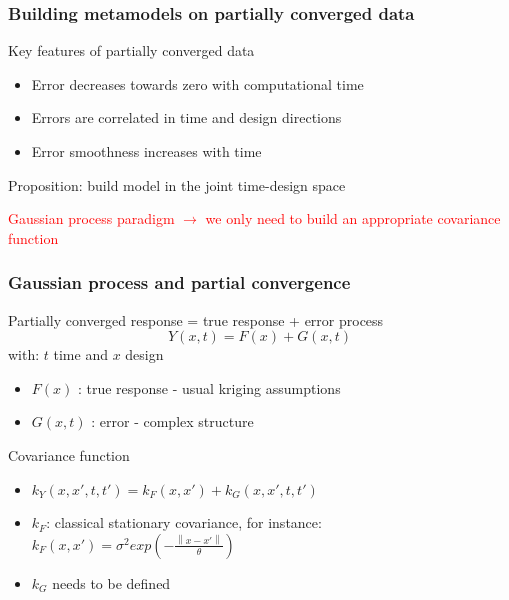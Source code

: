 \documentclass[10pt]{beamer}
\begin{document}
\frame
{
\frametitle{Building metamodels on partially converged data}

\begin{block}{Key features of partially converged data}
\begin{itemize}
 \item Error decreases towards zero with computational time
 \item Errors are correlated in time and design directions
 \item Error smoothness increases with time
\end{itemize}
\end{block}

\begin{block}{Proposition: build model in the joint time-design space}
\end{block}

\begin{block}{\textcolor{red}{Gaussian process paradigm $\rightarrow$ we only need to build an appropriate covariance function}}
\end{block}
}

\frame
{
\frametitle{Gaussian process and partial convergence}
\begin{block}{Partially converged response = true response + error process}
$$Y(x,t) = F(x) + G(x,t)$$
with: $t$ time and $x$ design
\begin{itemize}
 \item $F(x)$ : true response - usual kriging assumptions
 \item $G(x,t)$ : error - complex structure
\end{itemize}
\end{block}

\begin{block}{Covariance function}
\begin{itemize}
	\item $k_Y(x,x',t,t') = k_F(x,x') + k_G(x,x',t,t')$
	\item $k_F$: classical stationary covariance, for instance: $k_F(x,x') = \sigma^2 exp \left( -\frac{\left\| x - x' \right\|}{\theta} \right)$
	\item $k_G$ needs to be defined
\end{itemize}
\end{block}
}
\end{document}
